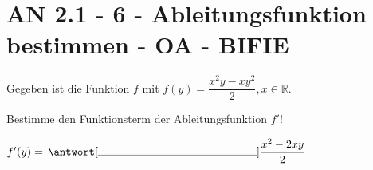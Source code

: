 \section{AN 2.1 - 6 - Ableitungsfunktion bestimmen - OA - BIFIE}

\begin{beispiel}[AN 2.1]{1} %
				Gegeben ist die Funktion $f$ mit $f(y)=\dfrac{x^2y-xy^2}{2},x\in\mathbb{R}$.

Bestimme den Funktionsterm der Ableitungsfunktion $f'$!
\leer

$f'(y)=\,\antwort[\rule{5cm}{0.3pt}]{\dfrac{x^2-2xy}{2}}$
\end{beispiel}